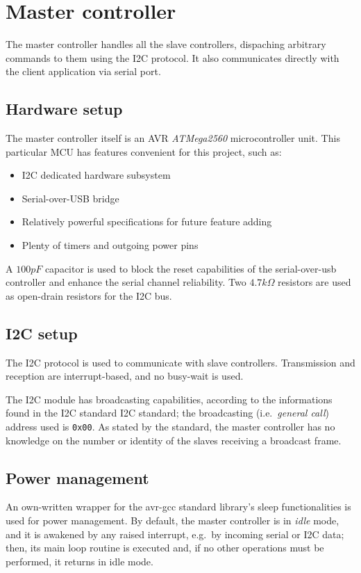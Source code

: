 \chapter{Master controller}
\label{ch:master}
The master controller handles all the slave controllers, dispaching arbitrary
commands to them using the I2C protocol. It also communicates directly with the
client application via serial port.

\section{Hardware setup}
The master controller itself is an AVR \emph{ATMega2560} microcontroller
unit\cite{at2560-ref}. This particular MCU has features convenient for this
project, such as:
\begin{itemize}
  \item I2C dedicated hardware subsystem
  \item Serial-over-USB bridge
  \item Relatively powerful specifications for future feature adding
  \item Plenty of timers and outgoing power pins
\end{itemize}

A $100 pF$ capacitor is used to block the reset capabilities of the
serial-over-usb controller and enhance the serial channel reliability. Two
$4.7 k\Omega$ resistors are used as open-drain resistors for the I2C bus.

\section{I2C setup}
The I2C protocol is used to communicate with slave controllers. Transmission
and reception are interrupt-based, and no busy-wait is used.

The I2C module has broadcasting capabilities, according to the informations
found in the I2C standard I2C standard\cite{i2c-ref}; the broadcasting (i.e.\
\emph{general call}) address used is \texttt{0x00}. As stated by the standard,
the master controller has no knowledge on the number or identity of the slaves
receiving a broadcast frame.

\section{Power management}
An own-written wrapper for the avr-gcc standard library's sleep functionalities
is used for power management.  By default, the master controller is in
\emph{idle} mode, and it is awakened by any raised interrupt, e.g.\ by incoming
serial or I2C data; then, its main loop routine is executed and, if no other
operations must be performed, it returns in idle mode.


